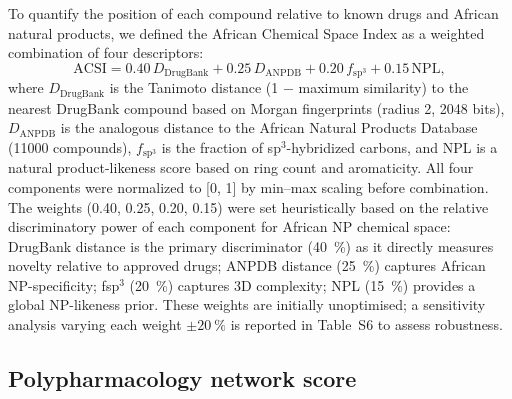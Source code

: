 \documentclass[11pt,a4paper]{article}
\begin{document}
To quantify the position of each compound relative to known drugs and African natural products, we defined the African Chemical Space Index as a weighted combination of four descriptors:
\begin{equation}
\mathrm{ACSI} = 0.40\,D_{\mathrm{DrugBank}} + 0.25\,D_{\mathrm{ANPDB}} + 0.20\,f_{\mathrm{sp}^3} + 0.15\,\mathrm{NPL},
\end{equation}
where $D_{\mathrm{DrugBank}}$ is the Tanimoto distance (1 $-$ maximum similarity) to the nearest DrugBank compound based on Morgan fingerprints (radius 2, 2048 bits), $D_{\mathrm{ANPDB}}$ is the analogous distance to the African Natural Products Database (\num{11000} compounds), $f_{\mathrm{sp}^3}$ is the fraction of sp$^3$-hybridized carbons, and NPL is a natural product-likeness score based on ring count and aromaticity. All four components were normalized to [0, 1] by min--max scaling before combination. The weights (0.40, 0.25, 0.20, 0.15) were set heuristically based on the relative discriminatory power of each component for African NP chemical space: DrugBank distance is the primary discriminator (\qty{40}{\percent}) as it directly measures novelty relative to approved drugs; ANPDB distance (\qty{25}{\percent}) captures African NP-specificity; fsp$^3$ (\qty{20}{\percent}) captures 3D complexity; NPL (\qty{15}{\percent}) provides a global NP-likeness prior. These weights are initially unoptimised; a sensitivity analysis varying each weight $\pm\qty{20}{\percent}$ is reported in Table~S6 to assess robustness.

\subsection{Polypharmacology network score}
\end{document}
